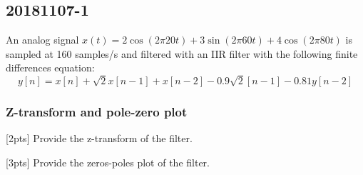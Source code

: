 \pagebreak\subsection{20181107-1}
    An analog signal $x(t)=2\cos(2\pi 20t)+3\sin(2\pi 60t)+4\cos(2\pi 80t)$ is sampled at 160 samples/s and filtered with an IIR filter with the following finite differences equation:
    $$
    y[n]=x[n]+\sqrt{2}x[n-1]+x[n-2]-0.9\sqrt{2}[n-1]-0.81y[n-2]
    $$

    \subsubsection{Z-transform and pole-zero plot}
    [2pts] Provide the z-transform of the filter.

    [3pts] Provide the zeros-poles plot of the filter.

